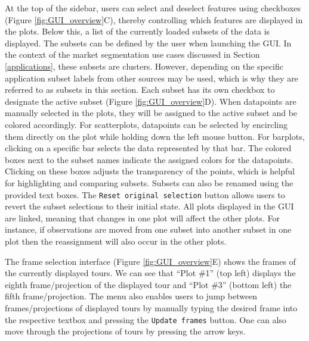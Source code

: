 \documentclass[article]{ajs}
\begin{document}
At the top of the sidebar, users can select and deselect features using checkboxes (Figure \ref{fig:GUI_overview}C), thereby controlling which features are displayed in the plots. Below this, a list of the currently loaded subsets of the data is displayed. The subsets can be defined by the user when launching the GUI. In the context of the market segmentation use cases discussed in Section \ref{applications}, these subsets are clusters. However, depending on the specific application subset labels from other sources may be used, which is why they are referred to as subsets in this section. Each subset has its own checkbox to designate the active subset (Figure \ref{fig:GUI_overview}D). When datapoints are manually selected in the plots, they will be assigned to the active subset and be colored accordingly. For scatterplots, datapoints can be selected by encircling them directly on the plot while holding down the left mouse button. For barplots, clicking on a specific bar selects the data represented by that bar. The colored boxes next to the subset names indicate the assigned colors for the datapoints. Clicking on these boxes adjusts the transparency of the points, which is helpful for highlighting and comparing subsets. Subsets can also be renamed using the provided text boxes. The \texttt{Reset original selection} button allows users to revert the subset selections to their initial state. All plots displayed in the GUI are linked, meaning that changes in one plot will affect the other plots. For instance, if observations are moved from one subset into another subset in one plot then the reassignment will also occur in the other plots. 

The frame selection interface (Figure \ref{fig:GUI_overview}E) shows the frames of the currently displayed tours. We can see that ``Plot $\#$1'' (top left) displays the eighth frame/projection of the displayed tour and ``Plot $\#$3'' (bottom left) the fifth frame/projection. The menu also enables users to jump between frames/projections of displayed tours by manually typing the desired frame into the respective textbox and pressing the \texttt{Update frames} button. One can also move through the projections of tours by pressing the arrow keys. 
\end{document}
